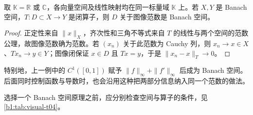 \begin{proposition}
\label{b1:prop:closed-operator-graph-norm}
取 \(\mathbb K=\mathbb R\) 或 \(\mathbb C\)，各向量空间及线性映射均在同一标量域 \(\mathbb K\) 上。若 \(X,Y\) 是 Banach 空间，\(T:D\subset X\to Y\) 是闭算子，则 \(D\) 关于图像范数是 Banach 空间。
\end{proposition}

\begin{proof}
正定性来自 \(\|x\|_X\)，齐次性和三角不等式来自 \(T\) 的线性与两个空间的范数公理，故图像范数确为范数。若 \((x_n)\) 关于此范数为 Cauchy 列，则 \(x_n\to x\in X\)、\(Tx_n\to y\in Y\)；图像闭保证 \(x\in D\) 且 \(Tx=y\)，于是 \(\|x_n-x\|_T\to0\)。
\end{proof}

特别地，上一例中的 \(C^1([0,1])\) 赋予 \(\|f\|_\infty+\|f'\|_\infty\) 后成为 Banach 空间。后面同时控制函数与导数时，也会沿用这种把两部分信息纳入同一个范数的做法。

选择一个 Banach 空间原理之前，应分别检查空间与算子的条件，见\cref{b1:tab:visual-t04}。


